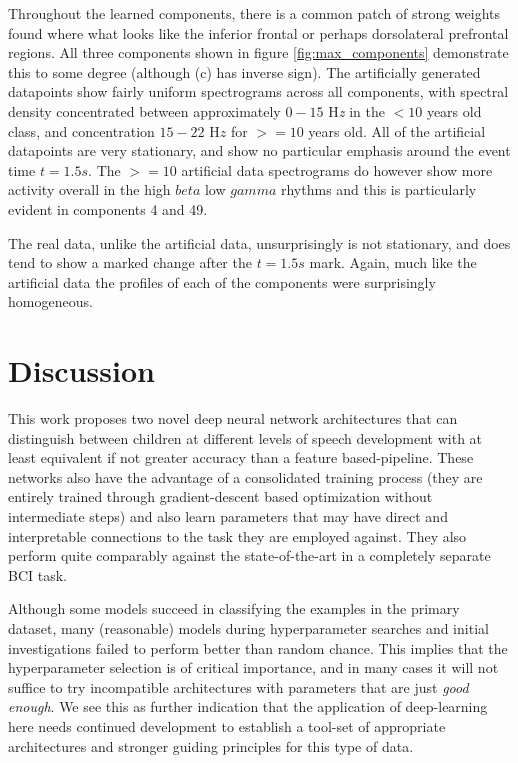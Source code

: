 \documentclass[fleqn,10pt]{wlscirep}
\begin{document}
Throughout the learned components, there is a common patch of strong weights found where what looks like the inferior frontal or perhaps dorsolateral prefrontal regions. All three components shown in figure \ref{fig:max_components} demonstrate this to some degree (although (c) has inverse sign). The artificially generated datapoints show fairly uniform spectrograms across all components, with spectral density concentrated between approximately $0-15$ H{\em z} in the $<10$ years old class, and concentration $15-22$ H$z$ for $>=10$ years old. All of the artificial datapoints are very stationary, and show no particular emphasis around the event time $t=1.5s$. The $>=10$ artificial data spectrograms do however show more activity overall in the high $beta$ low $gamma$ rhythms and this is particularly evident in components 4 and 49.

The real data, unlike the artificial data, unsurprisingly is not stationary, and does tend to show a marked change after the $t=1.5s$ mark. Again, much like the artificial data the profiles of each of the components were surprisingly homogeneous.

\section*{Discussion}

This work proposes two novel deep neural network architectures that can distinguish between children at different levels of speech development with at least equivalent if not greater accuracy than a feature based-pipeline. These networks also have the advantage of a consolidated training process (they are entirely trained through gradient-descent based optimization without intermediate steps) and also learn parameters that may have direct and interpretable connections to the task they are employed against. They also perform quite comparably against the state-of-the-art in a completely separate BCI task. 

Although some models succeed in classifying the examples in the primary dataset, many (reasonable) models during hyperparameter searches and initial investigations failed to perform better than random chance. This implies that the hyperparameter selection is of critical importance, and in many cases it will not suffice to try incompatible architectures with parameters that are just {\em good enough}. We see this as further indication that the application of deep-learning here needs continued development to establish a tool-set of appropriate architectures and stronger guiding principles for this type of data.
\end{document}
